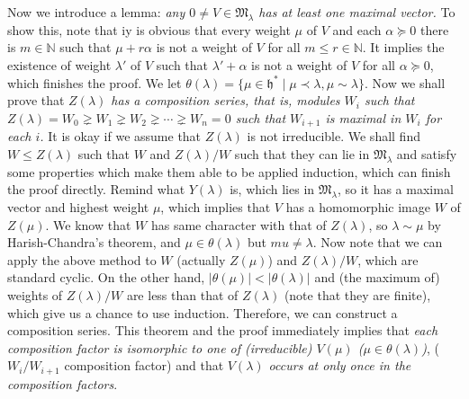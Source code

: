 \documentclass{article}
\newcommand{\NaN}{\mathbb{N}}
\newcommand{\SBar}{\;|\;}
\newcommand{\lie}[1]{\mathfrak{#1}}
\begin{document}
Now we introduce a lemma: \textit{any $0 \ne V \in \mathfrak{M}_\lambda$ has at least one maximal vector.}
To show this, note that iy is obvious that every weight $\mu$ of $V$ and each $\alpha \succeq 0$ there is $m \in \NaN$ such that $\mu + r\alpha$ is not a weight of $V$ for all $m \le r \in \NaN$.
It implies the existence of weight $\lambda'$ of $V$ such that $\lambda' + \alpha$ is not a weight of $V$ for all $\alpha \succeq 0$, which finishes the proof.
We let $\theta(\lambda) = \{\mu \in \lie{h}^* \SBar \mu \prec \lambda, \mu \sim \lambda\}$.
Now we shall prove that \textit{$Z(\lambda)$ has a composition series, that is, modules $W_i$ such that $Z(\lambda) = W_0 \gneq W_1 \gneq W_2 \gneq \cdots \gneq W_n = 0$ such that $W_{i + 1}$ is maximal in $W_i$ for each $i$.}
It is okay if we assume that $Z(\lambda)$ is not irreducible.
We shall find $W \le Z(\lambda)$ such that $W$ and $Z(\lambda)/W$ such that they can lie in $\mathfrak{M}_\lambda$ and satisfy some properties which make them able to be applied induction, which can finish the proof directly.
Remind what $Y(\lambda)$ is, which lies in $\mathfrak{M}_\lambda$, so it has a maximal vector and highest weight $\mu$, which implies that $V$ has a homomorphic image $W$ of $Z(\mu)$.
We know that $W$ has same character with that of $Z(\lambda)$, so $\lambda \sim \mu$ by Harish-Chandra's theorem, and $\mu \in \theta(\lambda)$ but $mu \ne \lambda$.
Now note that we can apply the above method to $W$ (actually $Z(\mu)$) and $Z(\lambda)/W$, which are standard cyclic.
On the other hand, $|\theta(\mu)| < |\theta(\lambda)|$ and (the maximum of) weights of $Z(\lambda)/W$ are less than that of $Z(\lambda)$ (note that they are finite), which give us a chance to use induction.
Therefore, we can construct a composition series.
This theorem and the proof immediately implies that \textit{each composition factor is isomorphic to one of (irreducible) $V(\mu)$ ($\mu \in \theta(\lambda)$)}, ($W_i / W_{i + 1}$ composition factor) and that \textit{$V(\lambda)$ occurs at only once in the composition factors}.
\end{document}
